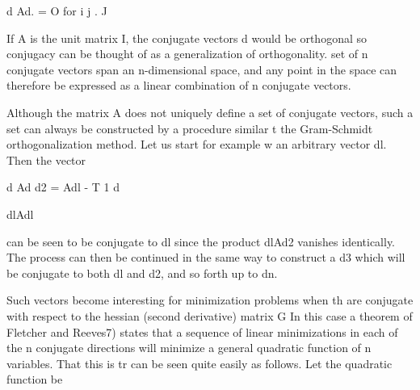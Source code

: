  
                        d Ad. = O   for   i  j .
                            J
 
 
If A is the unit matrix I, the conjugate vectors d would be orthogonal
so conjugacy can be thought of as a generalization of orthogonality.
set of n conjugate vectors span an n-dimensional space, and any point
in the space can therefore be expressed as a linear combination of n
conjugate vectors.
 
     Although the matrix A does not uniquely define a set of conjugate
vectors, such a set can always be constructed by a procedure similar t
the Gram-Schmidt orthogonalization method.  Let us start for example w
an arbitrary vector dl.  Then the vector
 
 
                                    d Ad
                      d2 = Adl -  T   1 d
 
                                    dlAdl
 
 
can be seen to be conjugate to dl since the product dlAd2 vanishes
identically.  The process can then be continued in the same way to
construct a d3 which will be conjugate to both dl and d2, and so forth
up to dn.
 
 
 
 
 
 
 
 
 
 
 
 
 
 
 
 
 
 
 
 
 
 
 
 
 
 
 
 
 
 
 
 
 
 
 
 
 
 
 
 
 
 
 
 
 
 
 
     Such vectors become interesting for minimization problems when th
are conjugate with respect to the hessian (second derivative) matrix G
In this case a theorem of Fletcher and Reeves7) states that a sequence
of linear minimizations in each of the n conjugate directions will
minimize a general quadratic function of n variables.  That this is tr
can be seen quite easily as follows.  Let the quadratic function be
 
